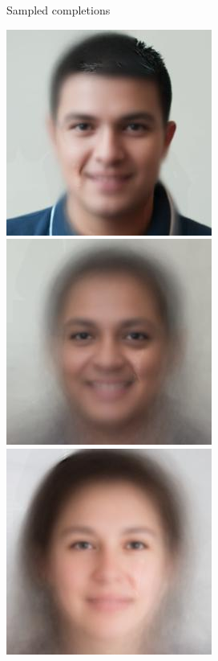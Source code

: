 \begin{figure}[t]
\begin{subfigure}[t]{0.73\textwidth}
    \caption{Sampled completions}
  \end{subfigure}
  \begin{subfigure}[t]{0.1\textwidth}
    \centering
    \includegraphics[height=\cmgfailureimgheight]{figs/cigcvae/co_mod_gan_failure/avg_aipo_0_3_2.jpg}
    \includegraphics[height=\cmgfailureimgheight]{figs/cigcvae/co_mod_gan_failure/avg_aipo_0_4_2.jpg}
    \includegraphics[height=\cmgfailureimgheight]{figs/cigcvae/co_mod_gan_failure/avg_aipo_1_4_2.jpg}

\end{subfigure}
\end{figure}
